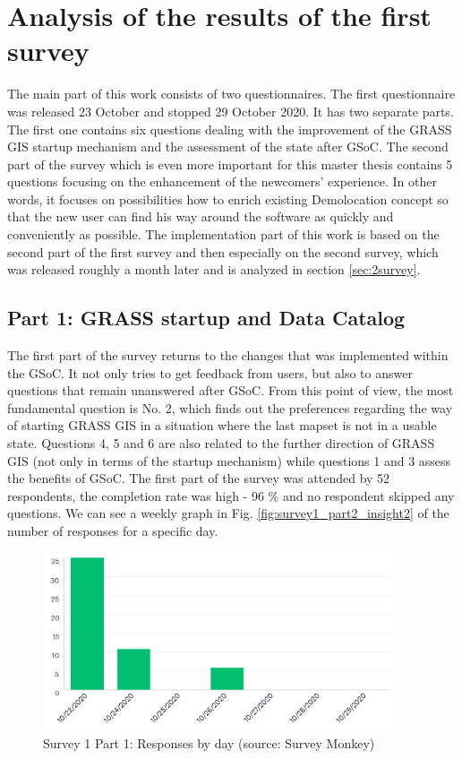 \documentclass[a4paper,10pt,twoside]{article}
\begin{document}
\section{Analysis of the results of the first survey}
\label{sec:qstat}

\noindent The main part of this work consists of two questionnaires. The first questionnaire was released 23 October and stopped 29 October 2020. It has two separate parts. The first one contains six questions dealing with the improvement of the GRASS GIS startup mechanism and the assessment of the state after GSoC. The second part of the survey which is even more important for this master thesis contains 5 questions focusing on the enhancement of the newcomers' experience. In other words, it focuses on possibilities how to enrich existing Demolocation concept so that the new user can find his way around the software as quickly and conveniently as possible. The implementation part of this work is based on the second part of the first survey and then especially on the second survey, which was released roughly a month later and is analyzed in section \ref{sec:2survey}.

\subsection{Part 1: GRASS startup and Data Catalog}

\noindent The first part of the survey returns to the changes that was implemented within the GSoC. It not only tries to get feedback from users, but also to answer questions that remain unanswered after GSoC. From this point of view, the most fundamental question is No. 2, which finds out the preferences regarding the way of starting GRASS GIS in a situation where the last mapset is not in a usable state. Questions 4, 5 and 6 are also related to the further direction of GRASS GIS (not only in terms of the startup mechanism) while questions 1 and 3 assess the benefits of GSoC. The first part of the survey was attended by 52 respondents, the completion rate was high - 96 \% and no respondent skipped any questions. We can see a weekly graph in Fig. \ref{fig:survey1_part2_insight2} of the number of responses for a specific day.

\begin{figure}[hbt!] 
\begin{center}
\includegraphics[width=10.5cm]{../surveys/analyzed_data/survey1_part1_insight2.png} 
\caption[Survey 1 Part 1: Responses by day]{Survey 1 Part 1: Responses by day (source: Survey Monkey)}
\label{fig:survey1_part1_insight2}
\end{center}
\end{figure}
\end{document}
